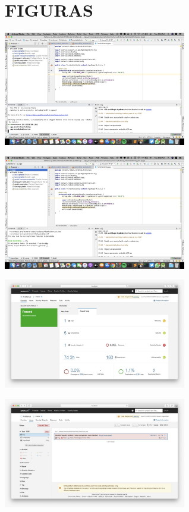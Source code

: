 \documentclass[twoside,twocolumn]{article}
\begin{document}
\section{FIGURAS}
\begin{center}
    \includegraphics[width=8cm]{Pentesting/Imagenes/WhatsApp Image 2020-06-23 at 3.54.43 PM.jpeg}
    
    \includegraphics[width=8cm]{Pentesting/Imagenes/WhatsApp Image 2020-06-23 at 3.55.13 PM.jpeg}
    
    \includegraphics[width=8cm]{Pentesting/Imagenes/WhatsApp Image 2020-06-23 at 3.56.38 PM.jpeg}
    
    \includegraphics[width=8cm]{Pentesting/Imagenes/WhatsApp Image 2020-06-23 at 3.57.11 PM.jpeg}
    

\end{center}
\end{document}
